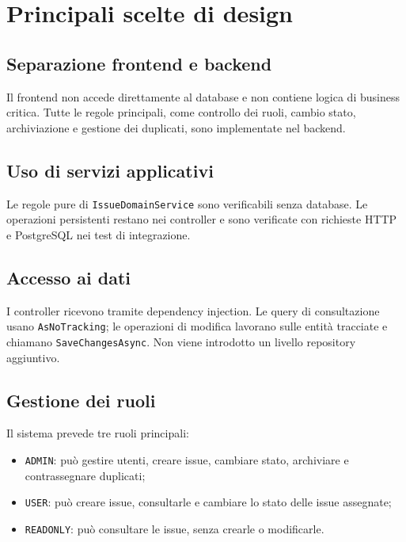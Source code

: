 \documentclass[12pt,a4paper]{article}
\begin{document}
\section{Principali scelte di design}

\subsection{Separazione frontend e backend}

Il frontend non accede direttamente al database e non contiene logica di business critica. Tutte le regole principali, come controllo dei ruoli, cambio stato, archiviazione e gestione dei duplicati, sono implementate nel backend.

\subsection{Uso di servizi applicativi}

Le regole pure di \texttt{IssueDomainService} sono verificabili senza database. Le operazioni persistenti restano nei controller e sono verificate con richieste HTTP e PostgreSQL nei test di integrazione.

\subsection{Accesso ai dati}

I controller ricevono  tramite dependency injection. Le query di consultazione usano \texttt{AsNoTracking}; le operazioni di modifica lavorano sulle entità tracciate e chiamano \texttt{SaveChangesAsync}. Non viene introdotto un livello repository aggiuntivo.

\subsection{Gestione dei ruoli}

Il sistema prevede tre ruoli principali:

\begin{itemize}
    \item \texttt{ADMIN}: può gestire utenti, creare issue, cambiare stato, archiviare e contrassegnare duplicati;
    \item \texttt{USER}: può creare issue, consultarle e cambiare lo stato delle issue assegnate;
    \item \texttt{READONLY}: può consultare le issue, senza crearle o modificarle.
\end{itemize}
\end{document}
